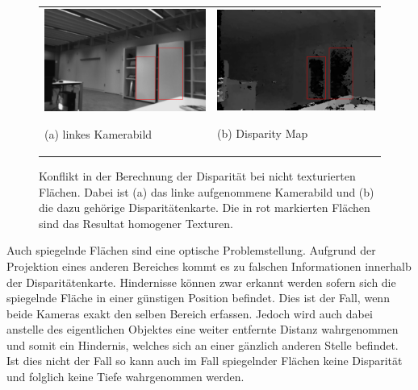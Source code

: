\begin{figure}[h]
	\centering
	\begin{tabular}{m{6.5cm} m{6.5cm}}
	\includegraphics[width=6.5cm]{img/disparity_error_left.pdf}
	\begin{center} \small (a) linkes Kamerabild \end{center}
	&
	\includegraphics[width=6.5cm]{img/disparity_error.pdf}
	\begin{center} \small (b) Disparity Map \end{center}
	\end{tabular}
    \caption{Konflikt in der Berechnung der Disparität bei nicht texturierten Flächen. Dabei ist (a) das linke aufgenommene Kamerabild und (b) die dazu gehörige Disparitätenkarte. Die in rot markierten Flächen sind das Resultat homogener Texturen.}
    \label{fig:disparity-error-homogeneous}
\end{figure}

\noindent
Auch spiegelnde Flächen sind eine optische Problemstellung. Aufgrund der Projektion eines anderen Bereiches kommt es zu falschen Informationen innerhalb der Disparitätenkarte. Hindernisse können zwar erkannt werden sofern sich die spiegelnde Fläche in einer günstigen Position befindet. Dies ist der Fall, wenn beide Kameras exakt den selben Bereich erfassen. Jedoch wird auch dabei anstelle des eigentlichen Objektes eine weiter entfernte Distanz wahrgenommen und somit ein Hindernis, welches sich an einer gänzlich anderen Stelle befindet. Ist dies nicht der Fall so kann auch im Fall spiegelnder Flächen keine Disparität und folglich keine Tiefe wahrgenommen werden.\\
    
